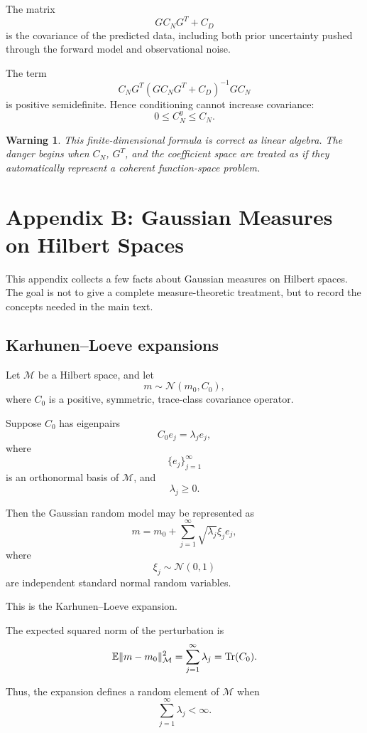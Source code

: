 \documentclass[11pt,a4paper]{book}
\newtheorem{warning}[definition]{Warning}
\newcommand{\M}{\mathcal{M}}      %
\begin{document}
The matrix
\[
    GC_NG^T+C_D
\]
is the covariance of the predicted data, including both prior uncertainty
pushed through the forward model and observational noise.

The term
\[
    C_NG^T
    \left(
        GC_NG^T+C_D
    \right)^{-1}
    GC_N
\]
is positive semidefinite. Hence conditioning cannot increase covariance:
\[
    0\leq C_N^y\leq C_N.
\]

\begin{warning}
This finite-dimensional formula is correct as linear algebra. The danger begins
when $C_N$, $G^T$, and the coefficient space are treated as if they automatically
represent a coherent function-space problem.
\end{warning}

\chapter{Appendix B: Gaussian Measures on Hilbert Spaces}

This appendix collects a few facts about Gaussian measures on Hilbert spaces.
The goal is not to give a complete measure-theoretic treatment, but to record
the concepts needed in the main text.

\section{Karhunen--Loeve expansions}

Let $\M$ be a Hilbert space, and let
\[
    m\sim\mathcal{N}(m_0,C_0),
\]
where $C_0$ is a positive, symmetric, trace-class covariance operator.

Suppose $C_0$ has eigenpairs
\[
    C_0e_j=\lambda_j e_j,
\]
where
\[
    \{e_j\}_{j=1}^{\infty}
\]
is an orthonormal basis of $\M$, and
\[
    \lambda_j\geq 0.
\]

Then the Gaussian random model may be represented as
\[
    m
    =
    m_0
    +
    \sum_{j=1}^{\infty}
    \sqrt{\lambda_j}\xi_j e_j,
\]
where
\[
    \xi_j\sim\mathcal{N}(0,1)
\]
are independent standard normal random variables.

This is the Karhunen--Loeve expansion.

The expected squared norm of the perturbation is
\[
    \mathbb{E}\|m-m_0\|_{\M}^2
    =
    \sum_{j=1}^{\infty}\lambda_j
    =
    \Tr(C_0).
\]

Thus, the expansion defines a random element of $\M$ when
\[
    \sum_{j=1}^{\infty}\lambda_j<\infty.
\]
\end{document}
